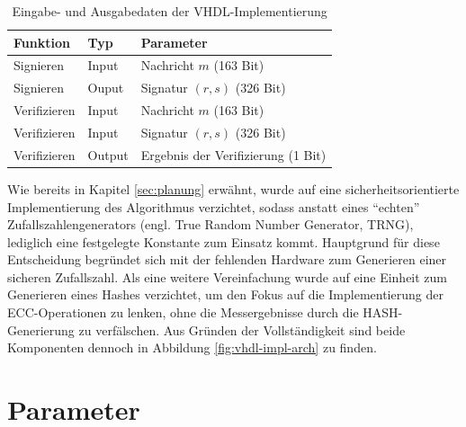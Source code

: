 \begin{table} [h]
	\centering 
	\begin{tabular}{ | p{3cm} | p{2cm} | p{6cm} | }
		\hline
		\textbf{Funktion} & \textbf{Typ} & \textbf{Parameter} \\
		\hline
		Signieren & Input &  Nachricht $m$ (163 Bit) \\
		\hline
		Signieren & Ouput & Signatur $(r,s)$ (326 Bit) \\
		\hline
		Verifizieren & Input & Nachricht $m$ (163 Bit) \\
		\hline
		Verifizieren & Input & Signatur $(r,s)$ (326 Bit) \\
		\hline
		Verifizieren & Output & Ergebnis der Verifizierung (1 Bit) \\
		\hline
	\end{tabular}
	\caption{Eingabe- und Ausgabedaten der VHDL-Implementierung}
	\label{tab:vhdl-impl-uart-data}
\end{table}
 
Wie bereits in Kapitel \ref{sec:planung} erwähnt, wurde auf eine sicherheitsorientierte Implementierung des Algorithmus verzichtet, sodass anstatt eines ``echten'' Zufallszahlengenerators  (engl. True Random Number Generator, TRNG), lediglich eine festgelegte Konstante zum Einsatz kommt. Hauptgrund für diese Entscheidung begründet sich mit der fehlenden Hardware zum Generieren einer sicheren Zufallszahl. Als eine weitere Vereinfachung wurde auf eine Einheit zum Generieren eines Hashes verzichtet, um den Fokus auf die Implementierung der ECC-Operationen zu lenken, ohne die Messergebnisse durch die HASH-Generierung zu verfälschen. Aus Gründen der Vollständigkeit sind beide Komponenten dennoch in Abbildung \ref{fig:vhdl-impl-arch} zu finden. 


\section{Parameter}
\label{vhdl-impl-parameter}

